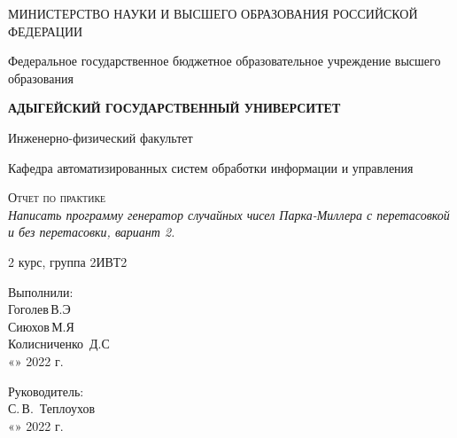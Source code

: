 \documentclass[12pt,a4paper]{scrartcl}
\begin{document}
	\begin{titlepage}
		\begin{center}
			\large
			МИНИСТЕРСТВО НАУКИ И ВЫСШЕГО ОБРАЗОВАНИЯ РОССИЙСКОЙ ФЕДЕРАЦИИ
			
			Федеральное государственное бюджетное образовательное учреждение высшего образования
			
			\textbf{АДЫГЕЙСКИЙ ГОСУДАРСТВЕННЫЙ УНИВЕРСИТЕТ}
			\vspace{0.25cm}
			
			Инженерно-физический факультет
			
			Кафедра автоматизированных систем обработки информации и управления
			\vfill
                         \vfill 
                          
                         \textsc{Отчет по практике}\\[5mm] 
                          
                         {\LARGE \textit{Написать программу генератор случайных чисел Парка-Миллера с перетасовкой и без перетасовки, вариант 2.}} 
                         \bigskip 
                          
                         2 курс, группа 2ИВТ2 
                 \end{center} 
                 \vfill 
                  
                 \newlength{\ML} 
                 \hfill\begin{minipage}{0.5\textwidth} 
                         Выполнили:\\ 
                         \underline{\hspace{\ML}} Гоголев\,В.Э\\ 
                         \underline{\hspace{\ML}} Сиюхов\,М.Я\\
                         \underline{\hspace{\ML}} Колисниченко \,Д.С\\
                         «\underline{\hspace{0.7cm}}» \underline{\hspace{2cm}} 2022 г. 
                 \end{minipage}%
                 \bigskip 
                  
                 \hfill\begin{minipage}{0.5\textwidth} 
                         Руководитель:\\ 
                         \underline{\hspace{\ML}} С.\,В.~Теплоухов\\ 
                         «\underline{\hspace{0.7cm}}» \underline{\hspace{2cm}} 2022 г. 
                 \end{minipage}%
                 \vfill 
 

\end{titlepage}
\end{document}
